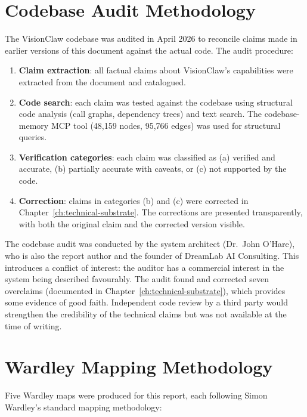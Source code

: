 \section{Codebase Audit Methodology}

The VisionClaw codebase was audited in April 2026 to reconcile claims made in earlier versions of this document against the actual code. The audit procedure:

\begin{enumerate}
  \item \textbf{Claim extraction}: all factual claims about VisionClaw's capabilities were extracted from the document and catalogued.
  \item \textbf{Code search}: each claim was tested against the codebase using structural code analysis (call graphs, dependency trees) and text search. The codebase-memory MCP tool (48,159 nodes, 95,766 edges) was used for structural queries.
  \item \textbf{Verification categories}: each claim was classified as (a) verified and accurate, (b) partially accurate with caveats, or (c) not supported by the code.
  \item \textbf{Correction}: claims in categories (b) and (c) were corrected in Chapter~\ref{ch:technical-substrate}. The corrections are presented transparently, with both the original claim and the corrected version visible.
\end{enumerate}

\begin{cautionbox}[title={Conflict of Interest}]
The codebase audit was conducted by the system architect (Dr.~John O'Hare), who is also the report author and the founder of DreamLab AI Consulting. This introduces a conflict of interest: the auditor has a commercial interest in the system being described favourably. The audit found and corrected seven overclaims (documented in Chapter~\ref{ch:technical-substrate}), which provides some evidence of good faith. Independent code review by a third party would strengthen the credibility of the technical claims but was not available at the time of writing.
\end{cautionbox}

\section{Wardley Mapping Methodology}

Five Wardley maps were produced for this report, each following Simon Wardley's standard mapping methodology:


